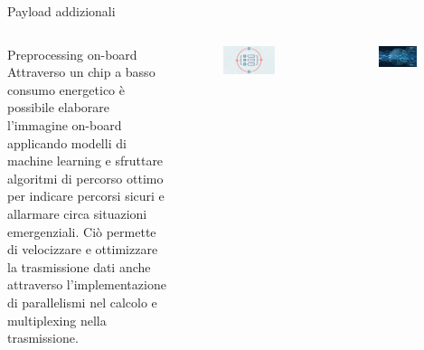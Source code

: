 \documentclass[xcolor=table]{beamer}
\begin{document}
\begin{frame}{Payload addizionali}

    
\begin{columns}
    
            \begin{block}{Preprocessing on-board}      
            Attraverso un chip a basso consumo energetico è possibile elaborare l'immagine on-board applicando modelli di machine learning e sfruttare algoritmi di percorso ottimo per indicare percorsi sicuri e allarmare circa situazioni emergenziali. Ciò permette di velocizzare e ottimizzare la trasmissione dati anche attraverso l'implementazione di parallelismi nel calcolo e multiplexing nella trasmissione.         
            \end{block}
    
            \begin{figure}
                \centering
                \includegraphics[width=0.8\textwidth]{proc.png}
            \end{figure}    
            \begin{figure}
                \centering
                \includegraphics[width=0.8\textwidth]{ai.jpg}
            \end{figure}    
    \end{columns}
    
\end{frame}
\end{document}
